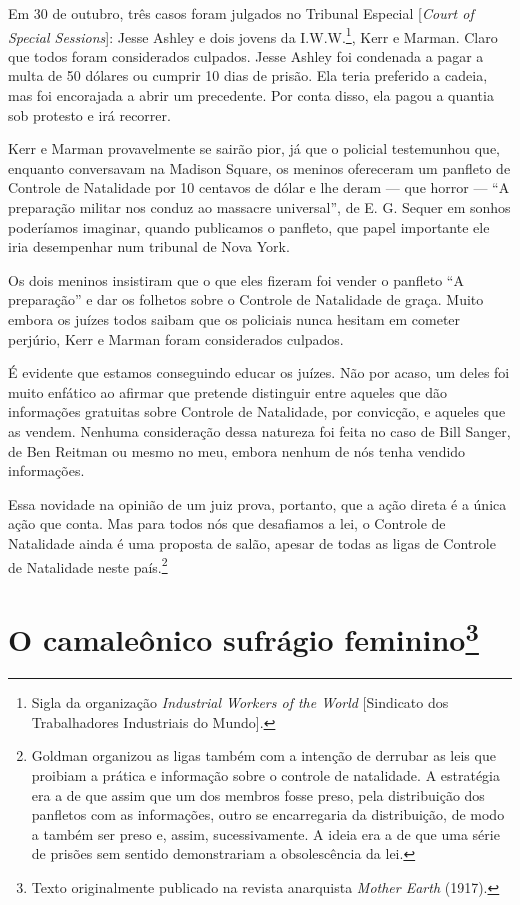 Em 30 de outubro, três casos foram julgados no Tribunal Especial
{[}\emph{Court of Special Sessions}{]}: Jesse Ashley e dois jovens da
I.W.W.\footnote{Sigla da organização \emph{Industrial Workers of the
  World} {[}Sindicato dos Trabalhadores Industriais do Mundo{]}.}, Kerr
e Marman. Claro que todos foram considerados culpados. Jesse Ashley foi
condenada a pagar a multa de 50 dólares ou cumprir 10 dias de prisão.
Ela teria preferido a cadeia, mas foi encorajada a abrir um precedente.
Por conta disso, ela pagou a quantia sob protesto e irá recorrer.

Kerr e Marman provavelmente se sairão pior, já que o policial
testemunhou que, enquanto conversavam na Madison Square, os meninos
ofereceram um panfleto de Controle de Natalidade por 10 centavos de
dólar e lhe deram --- que horror --- ``A preparação militar nos conduz
ao massacre universal'', de E. G. Sequer em sonhos poderíamos
imaginar, quando publicamos o panfleto, que papel importante ele iria
desempenhar num tribunal de Nova York.

Os dois meninos insistiram que o que eles fizeram foi vender o panfleto
``A preparação'' e dar os folhetos sobre o Controle de Natalidade de
graça. Muito embora os juízes todos saibam que os policiais nunca
hesitam em cometer perjúrio, Kerr e Marman foram considerados culpados.

É evidente que estamos conseguindo educar os juízes. Não por acaso, um
deles foi muito enfático ao afirmar que pretende distinguir entre
aqueles que dão informações gratuitas sobre Controle de Natalidade, por
convicção, e aqueles que as vendem. Nenhuma consideração dessa natureza
foi feita no caso de Bill Sanger, de Ben Reitman ou mesmo no meu, embora
nenhum de nós tenha vendido informações.

Essa novidade na opinião de um juiz prova, portanto, que a ação direta é
a única ação que conta. Mas para todos nós que desafiamos a lei, o
Controle de Natalidade ainda é uma proposta de salão, apesar de todas as
ligas de Controle de Natalidade neste país.\footnote{Goldman organizou
  as ligas também com a intenção de derrubar as leis que proibiam a
  prática e informação sobre o controle de natalidade. A estratégia era
  a de que assim que um dos membros fosse preso, pela distribuição dos panfletos com as informações, outro se encarregaria da distribuição, de modo a também ser preso e, assim, sucessivamente. A ideia era a de que uma série de prisões sem sentido demonstrariam a
  obsolescência da lei.}

\chapter{O camaleônico sufrágio feminino\footnote{Texto originalmente publicado
  na revista anarquista \emph{Mother Earth} (1917).}}

